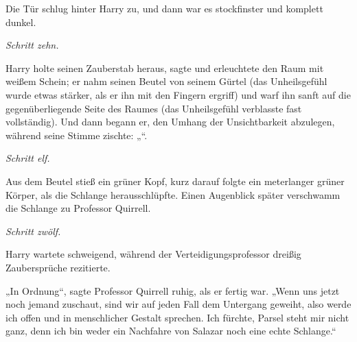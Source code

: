 Die Tür schlug hinter Harry zu, und dann war es stockfinster und komplett dunkel.

\emph{Schritt zehn.}

Harry holte seinen Zauberstab heraus, sagte  und erleuchtete den Raum mit weißem Schein; er nahm seinen Beutel von seinem Gürtel (das Unheilsgefühl wurde etwas stärker, als er ihn mit den Fingern ergriff) und warf ihn sanft auf die gegenüberliegende Seite des Raumes (das Unheilsgefühl verblasste fast vollständig). Und dann begann er, den Umhang der Unsichtbarkeit abzulegen, während seine Stimme zischte: „“.

\emph{Schritt elf.}

Aus dem Beutel stieß ein grüner Kopf, kurz darauf folgte ein meterlanger grüner Körper, als die Schlange herausschlüpfte. Einen Augenblick später verschwamm die Schlange zu Professor Quirrell.

\emph{Schritt zwölf.}

Harry wartete schweigend, während der Verteidigungsprofessor dreißig Zaubersprüche rezitierte.

„In Ordnung“, sagte Professor Quirrell ruhig, als er fertig war. „Wenn uns jetzt noch jemand zuschaut, sind wir auf jeden Fall dem Untergang geweiht, also werde ich offen und in menschlicher Gestalt sprechen. Ich fürchte, Parsel steht mir nicht ganz, denn ich bin weder ein Nachfahre von Salazar noch eine echte Schlange.“

